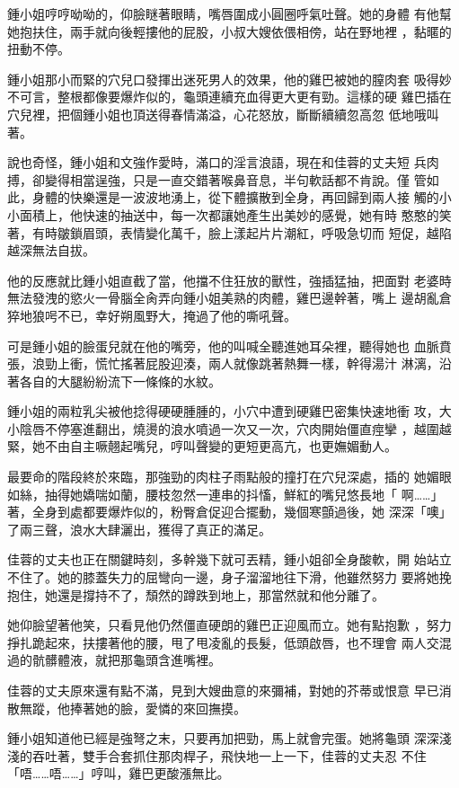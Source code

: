 鍾小姐哼哼呦呦的，仰臉瞇著眼睛，嘴唇圍成小圓圈呼氣吐聲。她的身體
有他幫她抱扶住，兩手就向後輕摟他的屁股，小叔大嫂依偎相傍，站在野地裡
，黏暱的扭動不停。

鍾小姐那小而緊的穴兒口發揮出迷死男人的效果，他的雞巴被她的膣肉套
吸得妙不可言，整根都像要爆炸似的，龜頭連續充血得更大更有勁。這樣的硬
雞巴插在穴兒裡，把個鍾小姐也頂送得春情滿溢，心花怒放，斷斷續續忽高忽
低地哦叫著。

說也奇怪，鍾小姐和文強作愛時，滿口的淫言浪語，現在和佳蓉的丈夫短
兵肉搏，卻變得相當逞強，只是一直交錯著喉鼻音息，半句軟話都不肯說。僅
管如此，身體的快樂還是一波波地湧上，從下體擴散到全身，再回歸到兩人接
觸的小小面積上，他快速的抽送中，每一次都讓她產生出美妙的感覺，她有時
憨憨的笑著，有時皺鎖眉頭，表情變化萬千，臉上漾起片片潮紅，呼吸急切而
短促，越陷越深無法自拔。

他的反應就比鍾小姐直截了當，他擋不住狂放的獸性，強插猛抽，把面對
老婆時無法發洩的慾火一骨腦全肏弄向鍾小姐美熟的肉體，雞巴邊幹著，嘴上
邊胡亂倉猝地狼呺不已，幸好朔風野大，掩過了他的嘶吼聲。

可是鍾小姐的臉蛋兒就在他的嘴旁，他的叫喊全聽進她耳朵裡，聽得她也
血脈賁張，浪勁上衝，慌忙搖著屁股迎湊，兩人就像跳著熱舞一樣，幹得湯汁
淋漓，沿著各自的大腿紛紛流下一條條的水紋。

鍾小姐的兩粒乳尖被他捻得硬硬腫腫的，小穴中遭到硬雞巴密集快速地衝
攻，大小陰唇不停塞進翻出，燒燙的浪水噴過一次又一次，穴肉開始僵直痙攣
，越圍越緊，她不由自主噘翹起嘴兒，哼叫聲變的更短更高亢，也更嫵媚動人。

最要命的階段終於來臨，那強勁的肉柱子雨點般的撞打在穴兒深處，插的
她媚眼如絲，抽得她嬌喘如蘭，腰枝忽然一連串的抖慉，鮮紅的嘴兒悠長地「
啊……」著，全身到處都要爆炸似的，粉臀倉促迎合擺動，幾個寒顫過後，她
深深「噢」了兩三聲，浪水大肆灑出，獲得了真正的滿足。

佳蓉的丈夫也正在關鍵時刻，多幹幾下就可丟精，鍾小姐卻全身酸軟，開
始站立不住了。她的膝蓋失力的屈彎向一邊，身子溜溜地往下滑，他雖然努力
要將她挽抱住，她還是撐持不了，頹然的蹲跌到地上，那當然就和他分離了。

她仰臉望著他笑，只看見他仍然僵直硬朗的雞巴正迎風而立。她有點抱歉
，努力掙扎跪起來，扶摟著他的腰，甩了甩凌亂的長髮，低頭啟唇，也不理會
兩人交混過的骯髒體液，就把那龜頭含進嘴裡。

佳蓉的丈夫原來還有點不滿，見到大嫂曲意的來彌補，對她的芥蒂或恨意
早已消散無蹤，他捧著她的臉，愛憐的來回撫摸。

鍾小姐知道他已經是強弩之末，只要再加把勁，馬上就會完蛋。她將龜頭
深深淺淺的吞吐著，雙手合套抓住那肉桿子，飛快地一上一下，佳蓉的丈夫忍
不住「唔……唔……」哼叫，雞巴更酸漲無比。

